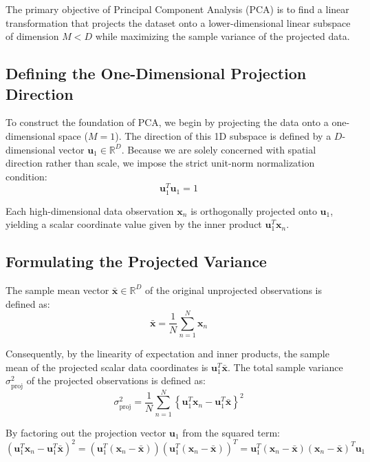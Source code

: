 \documentclass[11pt,a4paper]{article}
\begin{document}
The primary objective of Principal Component Analysis (PCA) is to find a linear transformation that projects the dataset onto a lower-dimensional linear subspace of dimension $M < D$ while maximizing the sample variance of the projected data.

\subsection{Defining the One-Dimensional Projection Direction}
To construct the foundation of PCA, we begin by projecting the data onto a one-dimensional space ($M = 1$). The direction of this 1D subspace is defined by a $D$-dimensional vector $\mathbf{u}_1 \in \mathbb{R}^D$. Because we are solely concerned with spatial direction rather than scale, we impose the strict unit-norm normalization condition:
\begin{equation}
\mathbf{u}_1^T \mathbf{u}_1 = 1
\end{equation}

Each high-dimensional data observation $\mathbf{x}_n$ is orthogonally projected onto $\mathbf{u}_1$, yielding a scalar coordinate value given by the inner product $\mathbf{u}_1^T \mathbf{x}_n$.

\subsection{Formulating the Projected Variance}
The sample mean vector $\mathbf{\bar{x}} \in \mathbb{R}^D$ of the original unprojected observations is defined as:
\begin{equation}
\mathbf{\bar{x}} = \frac{1}{N}\sum_{n=1}^{N} \mathbf{x}_n
\end{equation}

Consequently, by the linearity of expectation and inner products, the sample mean of the projected scalar data coordinates is $\mathbf{u}_1^T \mathbf{\bar{x}}$. The total sample variance $\sigma_{\text{proj}}^2$ of the projected observations is defined as:
\begin{equation}
\sigma_{\text{proj}}^2 = \frac{1}{N}\sum_{n=1}^{N} \left\{ \mathbf{u}_1^T \mathbf{x}_n - \mathbf{u}_1^T \mathbf{\bar{x}} \right\}^2
\end{equation}

By factoring out the projection vector $\mathbf{u}_1$ from the squared term:
\begin{equation}
\left( \mathbf{u}_1^T \mathbf{x}_n - \mathbf{u}_1^T \mathbf{\bar{x}} \right)^2 = \left( \mathbf{u}_1^T (\mathbf{x}_n - \mathbf{\bar{x}}) \right) \left( \mathbf{u}_1^T (\mathbf{x}_n - \mathbf{\bar{x}}) \right)^T = \mathbf{u}_1^T (\mathbf{x}_n - \mathbf{\bar{x}})(\mathbf{x}_n - \mathbf{\bar{x}})^T \mathbf{u}_1
\end{equation}
\end{document}

